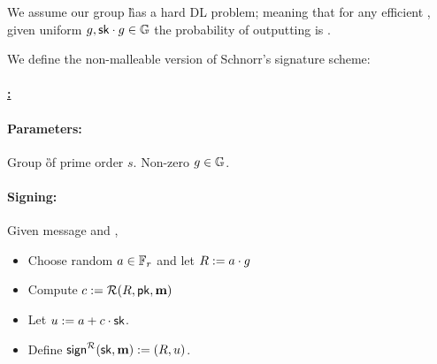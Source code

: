 \documentclass[11pt]{article}
\numberwithin{equation}{section} %
\numberwithin{figure}{section} %
\newtheorem{claim}[thm]{Claim}
\newcommand{\set}[1]{\ensuremath{\left\{#1\right\}}\xspace}
\newcommand{\eps}{\ensuremath{\epsilon}\xspace}
\begin{document}
% 
% 
% 
% 
 
 
 
 
 We assume our group \G has a hard DL problem; meaning that for any efficient \adv,
 given uniform $g,\mathsf{sk}\cdot g \in \mathbb{G}$ the probability of outputting \sk is \negl.
 
 We define the non-malleable version of Schnorr's signature scheme:
 
\paragraph{\underline{\schnorr:}} 
 \paragraph{Parameters:}
 Group \G of prime order $s$. Non-zero $g\in \mathbb{G}$.
 \paragraph{Signing:}
  Given message \msg and \sk, 
 \begin{itemize}
 \item Choose random $a\in {\mathbb F}_r$ and let $R:= a\cdot g$

  \item Compute $c:= \mathcal R(R,\mathsf{pk},\mathbf m)$
  \item Let $u:= a+c\cdot \mathsf{sk}$.
  \item Define $\mathsf{sign}^{\mathcal R}(\mathsf{sk},\mathbf m) := (R,u)$.
 \end{itemize}
\end{document}
